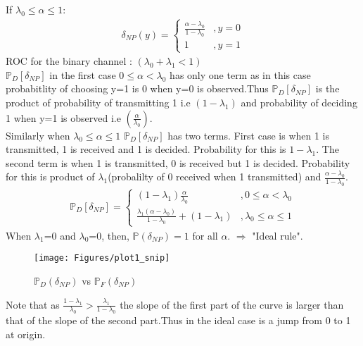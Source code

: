 \documentclass[12pt]{report}
\begin{document}
If $\lambda_0\leq\alpha\leq1$:\\[-10pt]
\begin{align*}
\delta_{NP}(y)=\left\{
\begin{array}{cc}
\frac{\alpha-\lambda_0}{1-\lambda_0} &, y=0\\
1 &, y=1
\end{array}\right.
\end{align*}
ROC for the binary channel : $(\lambda_0+\lambda_1<1)$\\
$\mathbb{P}_D[\delta_{NP}]$ in the first case $0\leq\alpha<\lambda_0$ has only one term as in this case probabitlity of choosing y=1 is 0 when y=0 is observed.Thus $\mathbb{P}_D[\delta_{NP}]$ is the product of probability of transmitting 1 i.e $(1-\lambda_1)$ and probability of deciding 1 when y=1 is observed i.e $(\frac{\alpha}{\lambda_0}).$\\
Similarly when $\lambda_0\leq\alpha\leq1$ $\mathbb{P}_D[\delta_{NP}]$ has two terms. First case is when 1 is transmitted, 1 is received and 1 is decided. Probability for this is  ${1-\lambda_1}$. The second term is when 1 is transmitted, 0 is received but 1 is decided. Probability for this is product of ${\lambda_1}$(probalilty of 0 received when 1 transmitted) and $\frac{\alpha-\lambda_0}{1-\lambda_0}$.
\begin{align*}
\mathbb{P}_D[\delta_{NP}]=\left\{
\begin{array}{cc}
(1-\lambda_1)\frac{\alpha}{\lambda_0} &, 0\leq\alpha<\lambda_0\\
\frac{\lambda_1(\alpha-\lambda_0)}{1-\lambda_0}+(1-\lambda_1) &, \lambda_0\leq\alpha\leq1
\end{array}\right.
\end{align*}
When $\lambda_1$=0 and $\lambda_0$=0, then, $\mathbb{P}(\delta_{NP})=1$ for all $\alpha$. $\Rightarrow$ "Ideal rule".\\
\begin{figure}[h]
\centering
\texttt{[image: Figures/plot1\_snip]}
\caption{$\mathbb{P}_D(\delta_{NP})$ vs $\mathbb{P}_F(\delta_{NP})$}
\end{figure}
Note that as $\frac{1-\lambda_1}{\lambda_0}>\frac{\lambda_1}{1-\lambda_0}$
the slope of the first part of the curve is larger than that of the slope of the second part.Thus in the ideal case is a jump from 0 to 1 at origin.\\
\end{document}
